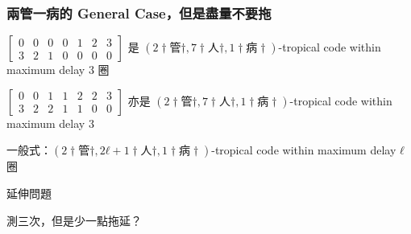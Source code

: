 \documentclass[12pt,aspectratio=1610]{beamer}
\def\pp{\pause\par}
\begin{document}
\begin{frame}\frametitle{兩管一病的 General Case，但是盡量不要拖}
	$\begin{bmatrix}
		0 & 0 & 0 & 0 & 1 & 2 & 3 \\
		3 & 2 & 1 & 0 & 0 & 0 & 0
	\end{bmatrix}$
	是 $(2†管†, 7†人†, 1†病†)$-tropical code within maximum delay $3$ 圈
	\pp
	$\begin{bmatrix}
		0 & 0 & 1 & 1 & 2 & 2 & 3 \\
		3 & 2 & 2 & 1 & 1 & 0 & 0
	\end{bmatrix}$
	亦是 $(2†管†, 7†人†, 1†病†)$-tropical code within maximum delay $3$
	\pp
	一般式：$(2†管†, 2ℓ+1†人†, 1†病†)$-tropical code within maximum delay $ℓ$ 圈
\end{frame}

\begin{frame}\centering
	\huge\alert{延伸問題}

	\Huge 測三次，但是少一點拖延？
\end{frame}
\end{document}
